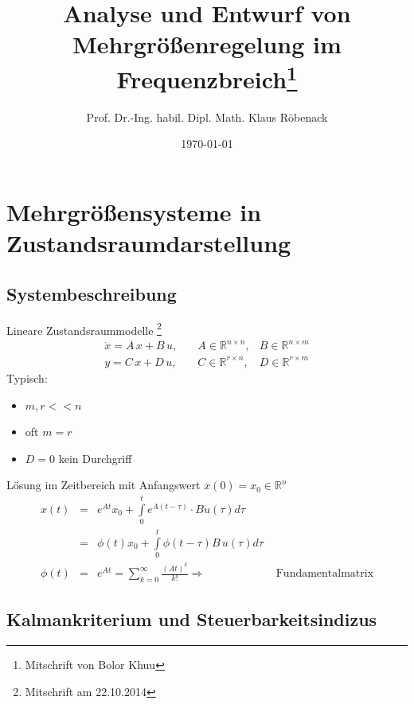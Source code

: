 \documentclass[ngerman]{tudscrreprt}
\begin{document}
 \department{}   \title{Analyse und Entwurf von Mehrgrößenregelung im Frequenzbreich\footnote{Mitschrift von Bolor Khuu}}
\author{Prof. Dr.-Ing. habil. Dipl. Math. Klaus Röbenack}
\date{\today}
\maketitle
\tableofcontents
\newpage
\chapter{Mehrgrößensysteme in Zustandsraumdarstellung}
\section{Systembeschreibung}
Lineare Zustandsraummodelle \footnote{Mitschrift am 22.10.2014}
\begin{equation*}
\begin{matrix}
\dot x = A\,x + B\,u, \quad&A\in \mathbb{R}^{n\times n},&B\in \mathbb{R}^{n\times m}\\ 
     y = C\,x + D\,u, \quad&C\in \mathbb{R}^{r\times n},&D\in \mathbb{R}^{r\times m} 
\end{matrix}
\end{equation*}
Typisch:
\begin{itemize}
\item $m,r << n$ 
\item oft $m = r$
\item $D= 0$ kein Durchgriff
\end{itemize}
Lösung im Zeitbereich mit Anfangswert $x(0) = x_0 \in \mathbb{R}^{n}$
\begin{equation*}
\begin{matrix}
x(t) 	&=& e^{At}x_0 + \int\limits_{0}^{t}e^{A(t-\tau)}\cdot B u(\tau)d\tau &\\ 
		&=&\phi(t)x_0 + \int\limits_{0}^{t}\phi(t-\tau)B\,u(\tau)d\tau&\\ 
\phi(t) &=&e^{At} = \sum\limits_{k=0}^{\infty}\frac{(At)^{k}}{k!} \Rightarrow &\text{ Fundamentalmatrix}
\end{matrix}
\end{equation*}
\section{Kalmankriterium und Steuerbarkeitsindizus}
\end{document}
